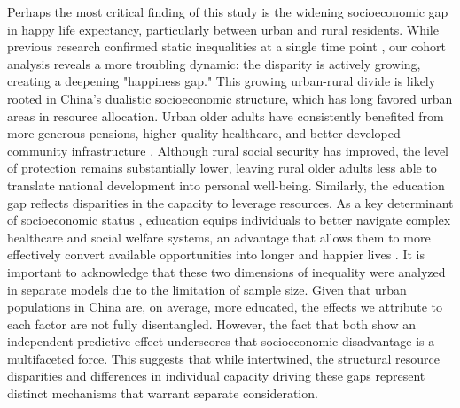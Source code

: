 \documentclass[12pt, a4paper]{article}
\begin{document}
Perhaps the most critical finding of this study is the widening socioeconomic gap in happy life expectancy, particularly between urban and rural residents. While previous research confirmed static inequalities at a single time point \autocite{wan.2024.socioeconomic}, our cohort analysis reveals a more troubling dynamic: the disparity is actively growing, creating a deepening "happiness gap." This growing urban-rural divide is likely rooted in China's dualistic socioeconomic structure, which has long favored urban areas in resource allocation. Urban older adults have consistently benefited from more generous pensions, higher-quality healthcare, and better-developed community infrastructure \autocite{liu.2019.are}. Although rural social security has improved, the level of protection remains substantially lower, leaving rural older adults less able to translate national development into personal well-being. Similarly, the education gap reflects disparities in the capacity to leverage resources. As a key determinant of socioeconomic status \autocite{link.1995.social, payne.2022.expansion,shen.2023.disability}, education equips individuals to better navigate complex healthcare and social welfare systems, an advantage that allows them to more effectively convert available opportunities into longer and happier lives \autocite{cheng.2021.sociodemographic,wan.2024.socioeconomic}. It is important to acknowledge that these two dimensions of inequality were analyzed in separate models due to the limitation of sample size. Given that urban populations in China are, on average, more educated, the effects we attribute to each factor are not fully disentangled. However, the fact that both show an independent predictive effect underscores that socioeconomic disadvantage is a multifaceted force. This suggests that while intertwined, the structural resource disparities and differences in individual capacity driving these gaps represent distinct mechanisms that warrant separate consideration.
\end{document}
